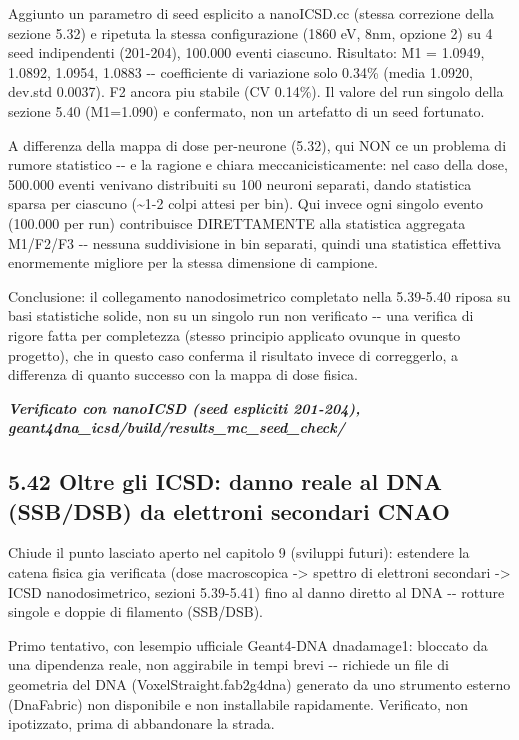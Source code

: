 \documentclass[
  italian,
]{article}
\begin{document}
Aggiunto un parametro di seed esplicito a nanoICSD.cc (stessa correzione della sezione 5.32) e ripetuta la stessa configurazione (1860 eV, 8nm, opzione 2) su 4 seed indipendenti (201-204), 100.000 eventi ciascuno. Risultato: M1 = 1.0949, 1.0892, 1.0954, 1.0883 -\/- coefficiente di variazione solo 0.34\% (media 1.0920, dev.std 0.0037). F2 ancora piu\textquotesingle{} stabile (CV 0.14\%). Il valore del run singolo della sezione 5.40 (M1=1.090) e\textquotesingle{} confermato, non un artefatto di un seed fortunato.

A differenza della mappa di dose per-neurone (5.32), qui NON c\textquotesingle e\textquotesingle{} un problema di rumore statistico -\/- e la ragione e\textquotesingle{} chiara meccanicisticamente: nel caso della dose, 500.000 eventi venivano distribuiti su 100 neuroni separati, dando statistica sparsa per ciascuno (\textasciitilde1-2 colpi attesi per bin). Qui invece ogni singolo evento (100.000 per run) contribuisce DIRETTAMENTE alla statistica aggregata M1/F2/F3 -\/- nessuna suddivisione in bin separati, quindi una statistica effettiva enormemente migliore per la stessa dimensione di campione.

Conclusione: il collegamento nanodosimetrico completato nella 5.39-5.40 riposa su basi statistiche solide, non su un singolo run non verificato -\/- una verifica di rigore fatta per completezza (stesso principio applicato ovunque in questo progetto), che in questo caso conferma il risultato invece di correggerlo, a differenza di quanto successo con la mappa di dose fisica.

\emph{\textbf{Verificato con nanoICSD (seed espliciti 201-204), geant4dna\_\allowbreak{}icsd/build/results\_\allowbreak{}mc\_\allowbreak{}seed\_\allowbreak{}check/}}

\subsection{5.42 Oltre gli ICSD: danno reale al DNA (SSB/DSB) da elettroni secondari CNAO}\label{oltre-gli-icsd-danno-reale-al-dna-ssbdsb-da-elettroni-secondari-cnao}

Chiude il punto lasciato aperto nel capitolo 9 (sviluppi futuri): estendere la catena fisica gia\textquotesingle{} verificata (dose macroscopica -\textgreater{} spettro di elettroni secondari -\textgreater{} ICSD nanodosimetrico, sezioni 5.39-5.41) fino al danno diretto al DNA -\/- rotture singole e doppie di filamento (SSB/DSB).

Primo tentativo, con l\textquotesingle esempio ufficiale Geant4-DNA dnadamage1: bloccato da una dipendenza reale, non aggirabile in tempi brevi -\/- richiede un file di geometria del DNA (VoxelStraight.fab2g4dna) generato da uno strumento esterno (DnaFabric) non disponibile e non installabile rapidamente. Verificato, non ipotizzato, prima di abbandonare la strada.
\end{document}
